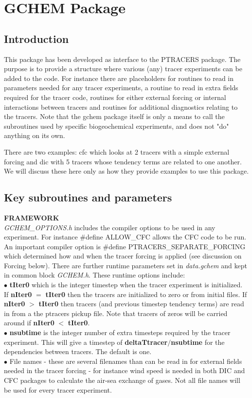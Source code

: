 \section {GCHEM Package} 

\subsection {Introduction}
This package has been developed as interface to the PTRACERS package.
The purpose is to provide a structure where various (any)
tracer experiments can be added to the code.
For instance there are placeholders for routines
to read in parameters needed for any tracer experiments, a routine
to read in extra fields required for the tracer code, routines
for either external forcing or internal interactions between tracers
and routines for additional diagnostics relating to the tracers.
Note that the gchem package itself is only a means to call
the subroutines used by specific biogeochemical experiments,
and does not "do" anything on its own.

There are two examples: cfc which looks at 2 tracers with a
simple external forcing and dic with 5 tracers whose tendency terms
are related to one another. We will discuss these here only as
how they provide examples to use this package.


\subsection {Key subroutines and parameters}

\noindent
{{\bf FRAMEWORK}} \\
{\it GCHEM\_OPTIONS.h} includes the compiler options to be used
in any experiment. For instance \#define ALLOW\_CFC allows
the CFC code to be run. An important compiler option is
 \#define PTRACERS\_SEPARATE\_FORCING which determined 
how and when the tracer forcing is applied (see discussion
on Forcing below).
 There are further runtime parameters
set in {\it data.gchem} and kept in common block {\it GCHEM.h}.
These runtime options include:\\
$\bullet$ {\bf tIter0} which is the integer timestep when the tracer experiment
 is initialized. If {\bf nIter0} $=$ {\bf tIter0} then the tracers
 are initialized to zero or from initial files. If {\bf nIter0} $>$
 {\bf tIter0} then tracers (and previous timestep tendency terms)
  are read in from a the ptracers pickup file. Note that tracers
  of zeros will be carried around if {\bf nIter0} $<$ {\bf tIter0}.
\\
$\bullet$ {\bf nsubtime} is the integer number of extra timesteps
 required by the tracer experiment. This will give a timestep
 of {\bf deltaTtracer}$/${\bf nsubtime} for the dependencies
 between tracers. The default is one.
\\
$\bullet$ File names - these are several filenames than can be read in
 for external fields needed in the tracer forcing - for instance
 wind speed is needed in both DIC and CFC packages to calculate
 the air-sea exchange of gases. Not all file names will be used 
 for every tracer experiment. 

